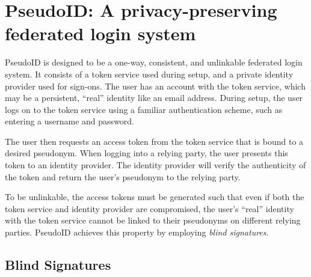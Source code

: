 \documentclass{llncs}
\begin{document}
\section{PseudoID: A privacy-preserving federated login system}
\label{sec:pseudoid}




PseudoID is designed to be a one-way, consistent, and unlinkable federated login system. It consists of a token service used during setup, and a private identity provider used for sign-ons. The user has an account with the token service, which may be a persistent, ``real'' identity like an email address. During setup, the user logs on to the token service using a familiar authentication scheme, such as entering a username and password.

The user then requests an access token from the token service that is bound to a desired pseudonym. When logging into a relying party, the user presents this token to an identity provider. The identity provider will verify the authenticity of the token and return the user's pseudonym to the relying party.

To be unlinkable, the access tokens must be generated such that even if both the token service and identity provider are compromised, the user's ``real'' identity with the token service cannot be linked to their pseudonyms on different relying parties. PseudoID achieves this property by employing \textit{blind signatures}.

\subsection{Blind Signatures}
\label{section:blind-sigs}
\end{document}
